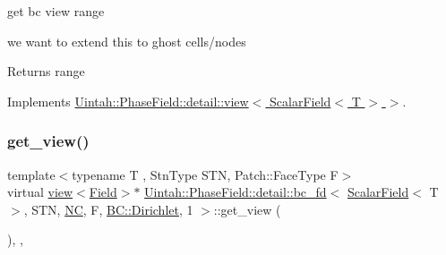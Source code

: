 get bc view range 

we want to extend this to ghost cells/nodes

\begin{DoxyReturn}{Returns}
range 
\end{DoxyReturn}


Implements \hyperlink{classUintah_1_1PhaseField_1_1detail_1_1view_3_01ScalarField_3_01T_01_4_01_4_a3e14b0c7a57a57707bb33954861ab1c1}{Uintah\+::\+Phase\+Field\+::detail\+::view$<$ Scalar\+Field$<$ T $>$ $>$}.

\mbox{\label{classUintah_1_1PhaseField_1_1detail_1_1bc__fd_3_01ScalarField_3_01T_01_4_00_01STN_00_01NC_00_01Fc8a6e28ffa258d282d0a921216b0ed9f_a27bd79a8b66a0a7a21a2473795f11911}} 
\subsubsection{\texorpdfstring{get\+\_\+view()}{get\_view()}\hspace{0.1cm}{\footnotesize\ttfamily [1/2]}}
{\footnotesize\ttfamily template$<$typename T , Stn\+Type S\+TN, Patch\+::\+Face\+Type F$>$ \\
virtual \hyperlink{classUintah_1_1PhaseField_1_1detail_1_1view}{view}$<$\hyperlink{structUintah_1_1PhaseField_1_1ScalarField}{Field}$>$$\ast$ \hyperlink{classUintah_1_1PhaseField_1_1detail_1_1bc__fd}{Uintah\+::\+Phase\+Field\+::detail\+::bc\+\_\+fd}$<$ \hyperlink{structUintah_1_1PhaseField_1_1ScalarField}{Scalar\+Field}$<$ T $>$, S\+TN, \hyperlink{namespaceUintah_1_1PhaseField_a33d355affda78a83f45755ba8388cedda77924170fe82bfd58b74ca3e44139718}{NC}, F, \hyperlink{namespaceUintah_1_1PhaseField_a148fba372aa3be96fd6eede7a2fa10b5abac152b762896edff34ed668ae1a546f}{B\+C\+::\+Dirichlet}, 1 $>$\+::get\+\_\+view (\begin{DoxyParamCaption}{ }\end{DoxyParamCaption})\hspace{0.3cm}{\ttfamily [inline]}, {\ttfamily [override]}, {\ttfamily [virtual]}}



